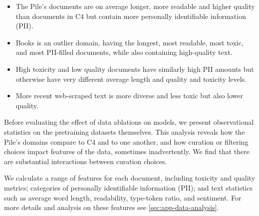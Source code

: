 \documentclass{article}
\begin{document}
\begin{tcolorbox}[width=\textwidth,title={Section Findings}] %
\vspace{-2mm}
\begin{itemize}[itemsep=0pt, wide=3pt]
    \item The Pile's documents are on average longer, more readable and higher quality than documents in C4 but contain more personally identifiable information (PII).
    \item Books is an outlier domain, having the longest, most readable, most toxic, and most PII-filled documents, 
    while also containing high-quality text.
    \item High toxicity and low quality documents have similarly high PII amounts but otherwise
    have very different average
    length and quality and toxicity levels.
    \item More recent web-scraped text is 
    more diverse and less toxic but also lower quality.
\end{itemize}
\end{tcolorbox}

Before evaluating the effect of data ablations on models, we present observational statistics on the pretraining datasets themselves.
This analysis reveals how the Pile's domains compare to C4 and to one another, and how curation or filtering choices impact features of the data, sometimes inadvertently.
We find that there are substantial interactions between curation choices.

We calculate a range of features for each document, including toxicity and quality metrics; categories of personally identifiable information (PII); and text statistics such as average word length, readability, type-token ratio, and sentiment. For more details and analysis on these features see \cref{sec:app-data-analysis}.
\end{document}
